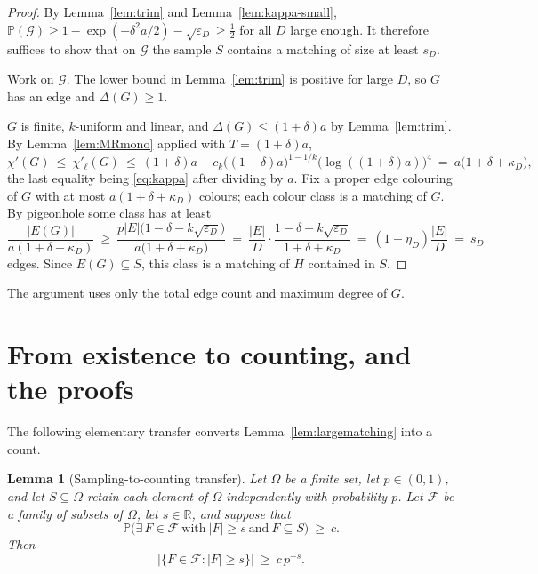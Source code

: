 \documentclass[11pt,a4paper]{amsart}
\theoremstyle{plain}
\newtheorem{lemma}[theorem]{Lemma}
\theoremstyle{definition}
\theoremstyle{remark}
\newcommand{\EE}{E}
\newcommand{\PP}{\mathbb{P}}
\newcommand{\chil}{\chi'_{\ell}}
\newcommand{\Deltaop}{\Delta}
\begin{document}
\begin{proof}
By Lemma~\ref{lem:trim} and Lemma~\ref{lem:kappa-small},
$\PP(\mathcal{G})\ge1-\exp(-\delta^2a/2)-\sqrt{\varepsilon_D}\ge\tfrac12$ for all
$D$ large enough. It therefore suffices to show that on $\mathcal{G}$ the sample $S$
contains a matching of size at least $s_D$.

Work on $\mathcal{G}$. The lower bound in Lemma~\ref{lem:trim} is positive for large
$D$, so $G$ has an edge and $\Deltaop(G)\ge1$.

$G$ is finite, $k$-uniform and linear, and $\Deltaop(G)\le(1+\delta)a$ by
Lemma~\ref{lem:trim}. By Lemma~\ref{lem:MRmono} applied with $T=(1+\delta)a$,
\[
  \chi'(G)\ \le\ \chil(G)\ \le\
  (1+\delta)a+c_k\bigl((1+\delta)a\bigr)^{1-1/k}\bigl(\log((1+\delta)a)\bigr)^4
  \ =\ a\bigl(1+\delta+\kappa_D\bigr),
\]
the last equality being \eqref{eq:kappa} after dividing by $a$. Fix a proper edge
colouring of $G$ with at most $a(1+\delta+\kappa_D)$ colours; each colour class is a
matching of $G$. By pigeonhole some class has at least
\[
  \frac{|E(G)|}{a(1+\delta+\kappa_D)}
  \ \ge\ \frac{p|\EE|\bigl(1-\delta-k\sqrt{\varepsilon_D}\bigr)}
              {a\bigl(1+\delta+\kappa_D\bigr)}
  \ =\ \frac{|\EE|}{D}\cdot
        \frac{1-\delta-k\sqrt{\varepsilon_D}}{1+\delta+\kappa_D}
  \ =\ (1-\eta_D)\frac{|\EE|}{D}\ =\ s_D
\]
edges. Since $E(G)\subseteq S$, this class is a matching of $H$ contained in $S$.
\end{proof}

The argument uses only the total edge count and maximum degree of $G$.

\section{From existence to counting, and the proofs}
\label{sec:proof}

The following elementary transfer converts Lemma~\ref{lem:largematching} into a count.

\begin{lemma}[Sampling-to-counting transfer]
\label{lem:transfer}
Let $\Omega$ be a finite set, let $p\in(0,1)$, and let $S\subseteq\Omega$ retain each
element of $\Omega$ independently with probability $p$. Let $\mathcal{F}$ be a family of
subsets of $\Omega$, let $s\in\mathbb{R}$, and suppose that
\[
  \PP\bigl(\exists\,F\in\mathcal{F}\ \text{with}\ |F|\ge s\ \text{and}\ F\subseteq S\bigr)
  \ \ge\ c .
\]
Then
\[
  \bigl|\{F\in\mathcal{F}: |F|\ge s\}\bigr|\ \ge\ c\,p^{-s}.
\]
\end{lemma}
\end{document}
